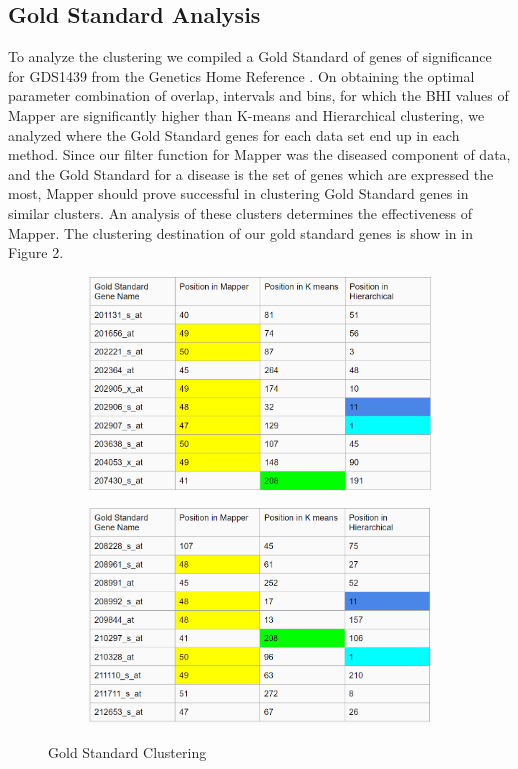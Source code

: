 \documentclass[preprint,10pt]{elsarticle}
\begin{document}
\subsection{Gold Standard Analysis}
	To analyze the clustering we compiled a Gold Standard of genes of significance for GDS1439 from the Genetics Home Reference \cite{pcgenes}. On obtaining the optimal parameter combination of overlap, intervals and bins, for which the BHI values of Mapper are significantly higher than K-means and Hierarchical clustering, we analyzed where the Gold Standard genes for each data set end up in each method. Since our filter function for Mapper was the diseased component of data, and the Gold Standard for a disease is the set of genes which are expressed the most, Mapper should prove successful in clustering Gold Standard genes in similar clusters. An analysis of these clusters determines the effectiveness of Mapper. The clustering destination of our gold standard genes is show in in Figure 2.
\begin{figure}
\centering
\begin{subfigure}{.5\textwidth}
  \centering
  \includegraphics[width=1\linewidth]{goldstandard1.png}
  \label{fig:sub1}
\end{subfigure}%
\begin{subfigure}{.5\textwidth}
  \centering
  \includegraphics[width=1\linewidth]{goldstandard2.png}
  \label{fig:sub2}
\end{subfigure}
\caption{Gold Standard Clustering}
\label{fig:test}
\end{figure}
\end{document}
